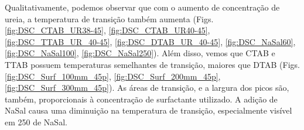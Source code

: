 		
		Qualitativamente, podemos observar que com o aumento de concentração de ureia, a temperatura de transição também aumenta (Figs. \ref{fig:DSC_CTAB_UR38-45}, \ref{fig:DSC_CTAB_UR40-45}, \ref{fig:DSC_TTAB_UR_40-45}, \ref{fig:DSC_DTAB_UR_40-45}, \ref{fig:DSC_NaSal60}, \ref{fig:DSC_NaSal100}, \ref{fig:DSC_NaSal250}). Além disso, vemos que CTAB e TTAB possuem temperaturas semelhantes de transição, maiores que DTAB (Figs. \ref{fig:DSC_Surf_100mm_45p}, \ref{fig:DSC_Surf_200mm_45p}, \ref{fig:DSC_Surf_300mm_45p}). As áreas de transição, e a largura dos picos são, também, proporcionais à concentração de surfactante utilizado. A adição de NaSal causa uma diminuição na temperatura de transição, especialmente visível em 250\mM{} de NaSal.
